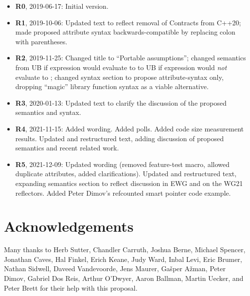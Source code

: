 \begin{itemize}
\item \textbf{R0}, 2019-06-17: Initial version.
\item \textbf{R1}, 2019-10-06: Updated text to reflect removal of Contracts from C++20; made proposed attribute syntax backwards-compatible by replacing colon with parentheses.
\item \textbf{R2}, 2019-11-25: Changed title to ``Portable assumptions''; changed semantics from UB if expression would evaluate to  to UB if expression would \emph{not} evaluate to ; changed syntax section to propose attribute-syntax only, dropping ``magic'' library function syntax as a viable alternative.
\item \textbf {R3}, 2020-01-13: Updated text to clarify the discussion of the proposed semantics and syntax.
\item \textbf{R4}, 2021-11-15:  Added wording. Added polls. Added code size measurement results. Updated and restructured text, adding discussion of proposed semantics and recent related work.
\item \textbf{R5}, 2021-12-09: Updated wording (removed feature-test macro, allowed duplicate attributes, added clarifications). Updated and restructured text, expanding semantics section to reflect discussion in EWG and on the WG21 reflectors. Added Peter Dimov's refcounted smart pointer code example.
\end{itemize}

\section*{Acknowledgements}

Many thanks to Herb Sutter, Chandler Carruth, Joshua Berne, Michael Spencer, Jonathan Caves, Hal Finkel, Erich Keane, Judy Ward, Inbal Levi, Eric Brumer, Nathan Sidwell, Daveed Vandevoorde, Jens Maurer, Ga\v sper A\v zman, Peter Dimov, Gabriel Dos Reis, Arthur O'Dwyer, Aaron Ballman, Martin Uecker, and Peter Brett for their help with this proposal.

\renewcommand{\bibname}{References}



